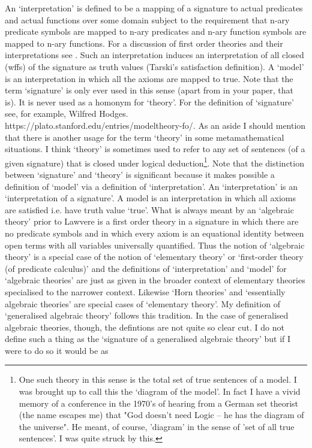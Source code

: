 \note An `interpretation' is defined to be a mapping of  a signature to actual predicates and actual functions over some domain subject to the requirement that n-ary predicate symbols are mapped to n-ary predicates and n-ary function symbols are mapped to n-ary functions. For a discussion of first order theories and their interpretations see \cite{Mendelson}.
Such an interpretation induces an interpretation of all
closed  (wffs) of the signature as truth values (Tarski's satisfaction definition). 
A `model' is an interpretation in which all the axioms are mapped to true. 
Note that the term `signature' is only ever used in this sense (apart from in your paper, that is). 
It is never used as a homonym for `theory'.  For the definition of `signature' see, for example, Wilfred Hodges. https://plato.stanford.edu/entries/modeltheory-fo/.
\note
As an aside I should mention that there is another usage for the term `theory' in some metamathematical situations. I think `theory' is sometimes used to refer to any set of sentences (of a given signature) that is closed under logical deduction\footnote{One such theory in this sense is the total set of true sentences of a model. 
I was brought up to call this the `diagram of the model'.  
In fact I have a vivid memory of a conference in the 1970's of hearing from a German set theorist (the  name escapes me)
 that "God doesn't need Logic -- he has the diagram of the universe". He meant, of course, 'diagram' in the sense of 'set of all true sentences'. I was quite struck by this.}.
\note
Note that the distinction between `signature' and `theory' is significant because it makes possible a definition of `model' 
via a definition of `interpretation'. An `interpretation' is an `interpretation of a signature'. 
A model is an interpretation in which all axioms are satisfied i.e. have truth value `true'.   
\note
What is always meant by an `algebraic theory' prior to Lawvere is a first order theory in a signature in which there are no predicate symbols and in which every axiom is an equational identity between open terms with all variables universally quantified. Thus the notion of `algebraic theory' is  
 a special case of the notion of `elementary theory' or `first-order theory (of predicate calculus)' and the 
definitions of `interpretation' and `model' for `algebraic theories' are just as given in the broader context of elementary theories specialised to the narrower context. Likewise  `Horn theories' and `essentially algebraic theories' are special cases of `elementary theory'. 
\note
My definition of `generalised algebraic theory' follows this tradition.  In the case of generalised algebraic theories, though, the defintions are not quite so clear cut. I do not define such a thing as the `signature of a generalised algebraic theory' but if I were to do so it would be as

